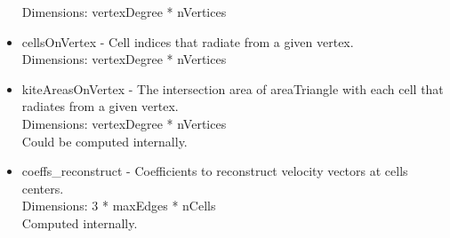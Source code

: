 \documentclass[11pt]{report}
\begin{document}
\begin{itemize}
		  Dimensions: vertexDegree * nVertices
	\item cellsOnVertex - Cell indices that radiate from a given vertex. \\
		  Dimensions: vertexDegree * nVertices
	\item kiteAreasOnVertex - The intersection area of areaTriangle with each cell that radiates from a given vertex. \\
		  Dimensions: vertexDegree * nVertices \\
		  Could be computed internally. 
	\item coeffs\_reconstruct - Coefficients to reconstruct velocity vectors at cells centers. \\
		  Dimensions: 3 * maxEdges * nCells \\
		  Computed internally. 
\end{itemize}
\end{document}
